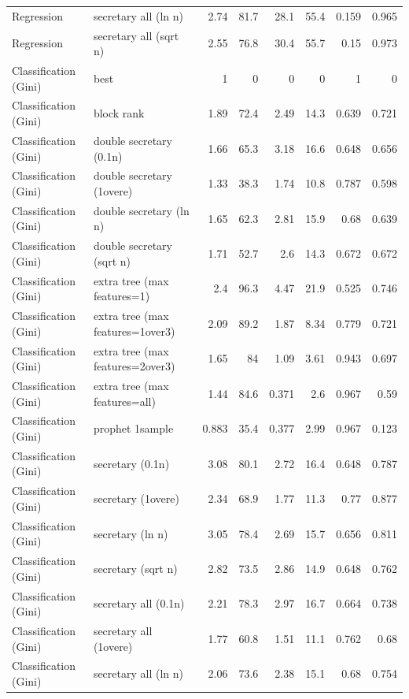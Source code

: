 \begin{table}[t]
\begin{tabular}{llrrrrrr}
Regression & secretary all (ln n) & 2.74 & 81.7 & 28.1 & 55.4 & 0.159 & 0.965 \\
Regression & secretary all (sqrt n) & 2.55 & 76.8 & 30.4 & 55.7 & 0.15 & 0.973 \\
Classification (Gini) & best & 1 & 0 & 0 & 0 & 1 & 0 \\
Classification (Gini) & block rank & 1.89 & 72.4 & 2.49 & 14.3 & 0.639 & 0.721 \\
Classification (Gini) & double secretary (0.1n) & 1.66 & 65.3 & 3.18 & 16.6 & 0.648 & 0.656 \\
Classification (Gini) & double secretary (1overe) & 1.33 & 38.3 & 1.74 & 10.8 & 0.787 & 0.598 \\
Classification (Gini) & double secretary (ln n) & 1.65 & 62.3 & 2.81 & 15.9 & 0.68 & 0.639 \\
Classification (Gini) & double secretary (sqrt n) & 1.71 & 52.7 & 2.6 & 14.3 & 0.672 & 0.672 \\
Classification (Gini) & extra tree (max features=1) & 2.4 & 96.3 & 4.47 & 21.9 & 0.525 & 0.746 \\
Classification (Gini) & extra tree (max features=1over3) & 2.09 & 89.2 & 1.87 & 8.34 & 0.779 & 0.721 \\
Classification (Gini) & extra tree (max features=2over3) & 1.65 & 84 & 1.09 & 3.61 & 0.943 & 0.697 \\
Classification (Gini) & extra tree (max features=all) & 1.44 & 84.6 & 0.371 & 2.6 & 0.967 & 0.59 \\
Classification (Gini) & prophet 1sample & 0.883 & 35.4 & 0.377 & 2.99 & 0.967 & 0.123 \\
Classification (Gini) & secretary (0.1n) & 3.08 & 80.1 & 2.72 & 16.4 & 0.648 & 0.787 \\
Classification (Gini) & secretary (1overe) & 2.34 & 68.9 & 1.77 & 11.3 & 0.77 & 0.877 \\
Classification (Gini) & secretary (ln n) & 3.05 & 78.4 & 2.69 & 15.7 & 0.656 & 0.811 \\
Classification (Gini) & secretary (sqrt n) & 2.82 & 73.5 & 2.86 & 14.9 & 0.648 & 0.762 \\
Classification (Gini) & secretary all (0.1n) & 2.21 & 78.3 & 2.97 & 16.7 & 0.664 & 0.738 \\
Classification (Gini) & secretary all (1overe) & 1.77 & 60.8 & 1.51 & 11.1 & 0.762 & 0.68 \\
Classification (Gini) & secretary all (ln n) & 2.06 & 73.6 & 2.38 & 15.1 & 0.68 & 0.754 \\

\end{tabular}
\end{table}
